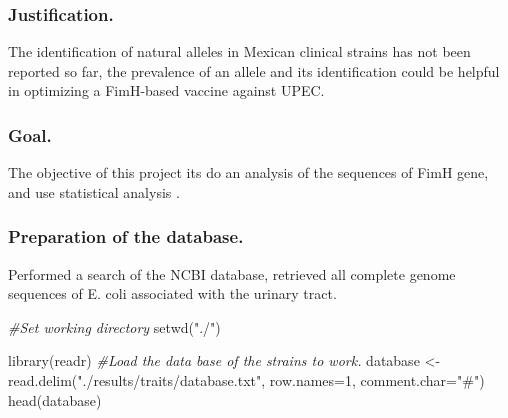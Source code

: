 \documentclass[
]{article}
\newenvironment{Shaded}{\begin{snugshade}}{\end{snugshade}}
\newcommand{\AttributeTok}[1]{\textcolor[rgb]{0.77,0.63,0.00}{#1}}
\newcommand{\CommentTok}[1]{\textcolor[rgb]{0.56,0.35,0.01}{\textit{#1}}}
\newcommand{\DecValTok}[1]{\textcolor[rgb]{0.00,0.00,0.81}{#1}}
\newcommand{\FunctionTok}[1]{\textcolor[rgb]{0.00,0.00,0.00}{#1}}
\newcommand{\NormalTok}[1]{#1}
\newcommand{\OtherTok}[1]{\textcolor[rgb]{0.56,0.35,0.01}{#1}}
\newcommand{\StringTok}[1]{\textcolor[rgb]{0.31,0.60,0.02}{#1}}
\begin{document}
\hypertarget{justification.}{%
\subsubsection{Justification.}\label{justification.}}

The identification of natural alleles in Mexican clinical strains has
not been reported so far, the prevalence of an allele and its
identification could be helpful in optimizing a FimH-based vaccine
against UPEC.

\hypertarget{goal.}{%
\subsubsection{Goal.}\label{goal.}}

The objective of this project its do an analysis of the sequences of
FimH gene, and use statistical analysis .

\hypertarget{preparation-of-the-database.}{%
\subsubsection{Preparation of the
database.}\label{preparation-of-the-database.}}

Performed a search of the NCBI database, retrieved all complete genome
sequences of E. coli associated with the urinary tract.

\begin{Shaded}
\begin{Highlighting}[]
\CommentTok{\#Set working directory}
\FunctionTok{setwd}\NormalTok{(}\StringTok{"./"}\NormalTok{)}
\end{Highlighting}
\end{Shaded}

\begin{Shaded}
\begin{Highlighting}[]
\FunctionTok{library}\NormalTok{(readr)}
\CommentTok{\#Load the data base of the strains to work.}
\NormalTok{database }\OtherTok{\textless{}{-}} \FunctionTok{read.delim}\NormalTok{(}\StringTok{"./results/traits/database.txt"}\NormalTok{, }\AttributeTok{row.names=}\DecValTok{1}\NormalTok{, }\AttributeTok{comment.char=}\StringTok{"\#"}\NormalTok{)}
\FunctionTok{head}\NormalTok{(database)}
\end{Highlighting}
\end{Shaded}
\end{document}
